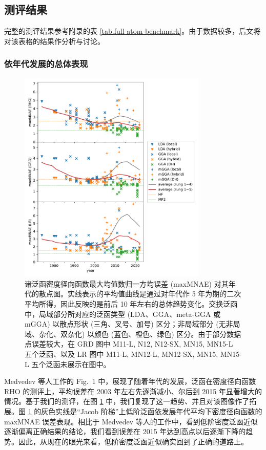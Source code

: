 \subsection{测评结果}

完整的测评结果参考附录的表 \ref{tab.full-atom-benchmark}。由于数据较多，后文将对该表格的结果作分析与讨论。

\subsubsection{依年代发展的总体表现}

\begin{figure}[tp]
    \centering
    \caption{诸泛函密度径向函数最大均值数归一方均误差 (maxMNAE) 对其年代的散点图。实线表示的平均值曲线是通过对年代作 5 年为期的二次平均所得，因此反映的是前后 10 年左右的总体趋势变化。交换泛函中，局域部分所对应的泛函类型 (LDA、GGA、meta-GGA 或 mGGA) 以散点形状 (三角、叉号、加号) 区分；非局域部分 (无非局域、杂化、双杂化) 以颜色 (蓝色、橙色、绿色) 区分。由于部分数据点误差较大，在 GRD 图中 M11-L, N12, N12-SX, MN15, MN15-L 五个泛函、以及 LR 图中 M11-L, MN12-L, MN12-SX, MN15, MN15-L 五个泛函未展示在图中。}
    \label{fig.maxMNAE-against-year}
    \includegraphics[width=0.8\textwidth]{assets/maxMNAE-against-year.pdf}
\end{figure}

Medvedev 等人工作的 Fig.\ 1 中，展现了随着年代的发展，泛函在密度径向函数 RHO 的测评上，平均误差在 2003 年左右先逐渐减小、尔后到 2015 年显著增大的情况。基于我们的测评，在图 \ref{fig.maxMNAE-against-year} 中，我们复现了这一趋势、并且对该图像作了拓展。图 \ref{fig.maxMNAE-against-year} 的灰色实线是“Jacob 阶梯”上低阶泛函依发展年代平均下密度径向函数的 maxMNAE 误差表现。相比于 Medvedev 等人的工作中，看到低阶密度泛函近似逐渐偏离正确结果的结论，我们看到误差在 2015 年达到高点以后逐渐下降的趋势。因此，从现在的眼光来看，低阶密度泛函近似确实回到了正确的道路上。

